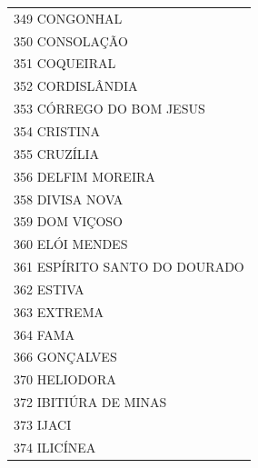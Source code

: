 \documentclass{article}
\begin{document}
\begin{longtable}[c]{m{18cm}}
\multicolumn{1}{l}{ \hspace{2em} 349 CONGONHAL } \\
\multicolumn{1}{l}{ \hspace{2em} 350 CONSOLAÇÃO } \\
\multicolumn{1}{l}{ \hspace{2em} 351 COQUEIRAL } \\
\multicolumn{1}{l}{ \hspace{2em} 352 CORDISLÂNDIA } \\
\multicolumn{1}{l}{ \hspace{2em} 353 CÓRREGO DO BOM JESUS } \\
\multicolumn{1}{l}{ \hspace{2em} 354 CRISTINA } \\
\multicolumn{1}{l}{ \hspace{2em} 355 CRUZÍLIA } \\
\multicolumn{1}{l}{ \hspace{2em} 356 DELFIM MOREIRA } \\
\multicolumn{1}{l}{ \hspace{2em} 358 DIVISA NOVA } \\
\multicolumn{1}{l}{ \hspace{2em} 359 DOM VIÇOSO } \\
\multicolumn{1}{l}{ \hspace{2em} 360 ELÓI MENDES } \\
\multicolumn{1}{l}{ \hspace{2em} 361 ESPÍRITO SANTO DO DOURADO } \\
\multicolumn{1}{l}{ \hspace{2em} 362 ESTIVA } \\
\multicolumn{1}{l}{ \hspace{2em} 363 EXTREMA } \\
\multicolumn{1}{l}{ \hspace{2em} 364 FAMA } \\
\multicolumn{1}{l}{ \hspace{2em} 366 GONÇALVES } \\
\multicolumn{1}{l}{ \hspace{2em} 370 HELIODORA } \\
\multicolumn{1}{l}{ \hspace{2em} 372 IBITIÚRA DE MINAS } \\
\multicolumn{1}{l}{ \hspace{2em} 373 IJACI } \\
\multicolumn{1}{l}{ \hspace{2em} 374 ILICÍNEA } \\

\end{longtable}
\end{document}
